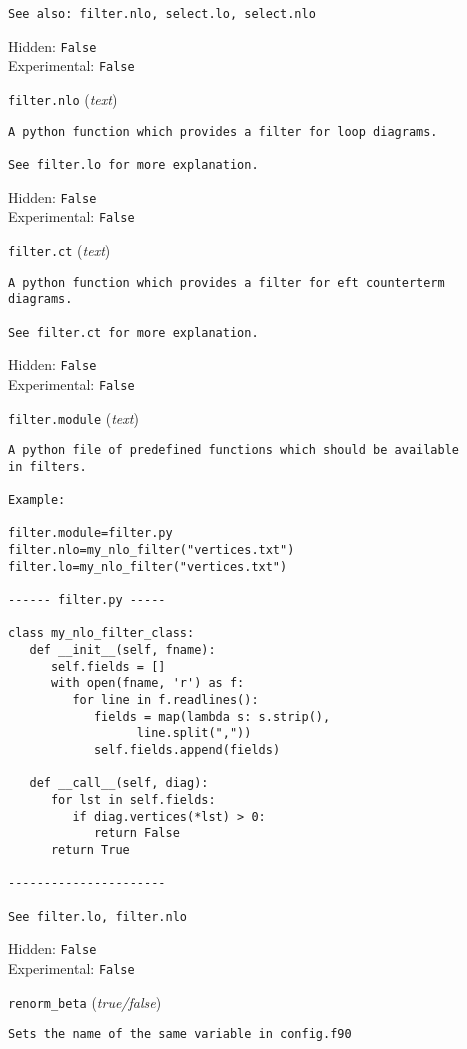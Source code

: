 \begin{basedescript}{\desclabelstyle{\pushlabel}}
\begin{verbatim}
See also: filter.nlo, select.lo, select.nlo
\end{verbatim}
Hidden: \verb|False|
\\Experimental: \verb|False|
\\\item[\colorbox{gray!30}{\texttt{filter.nlo}}] (\textit{text})
\begin{verbatim}
A python function which provides a filter for loop diagrams.

See filter.lo for more explanation.
\end{verbatim}
Hidden: \verb|False|
\\Experimental: \verb|False|
\\\item[\colorbox{gray!30}{\texttt{filter.ct}}] (\textit{text})
\begin{verbatim}
A python function which provides a filter for eft counterterm diagrams.

See filter.ct for more explanation.
\end{verbatim}
Hidden: \verb|False|
\\Experimental: \verb|False|
\\\item[\colorbox{gray!30}{\texttt{filter.module}}] (\textit{text})
\begin{verbatim}
A python file of predefined functions which should be available
in filters.

Example:

filter.module=filter.py
filter.nlo=my_nlo_filter("vertices.txt")
filter.lo=my_nlo_filter("vertices.txt")

------ filter.py -----

class my_nlo_filter_class:
   def __init__(self, fname):
      self.fields = []
      with open(fname, 'r') as f:
         for line in f.readlines():
            fields = map(lambda s: s.strip(),
                  line.split(","))
            self.fields.append(fields)

   def __call__(self, diag):
      for lst in self.fields:
         if diag.vertices(*lst) > 0:
            return False
      return True

----------------------

See filter.lo, filter.nlo
\end{verbatim}
Hidden: \verb|False|
\\Experimental: \verb|False|
\\\item[\colorbox{gray!30}{\texttt{renorm\_beta}}] (\textit{true/false})
\begin{verbatim}
Sets the name of the same variable in config.f90


\end{verbatim}
\end{basedescript}
